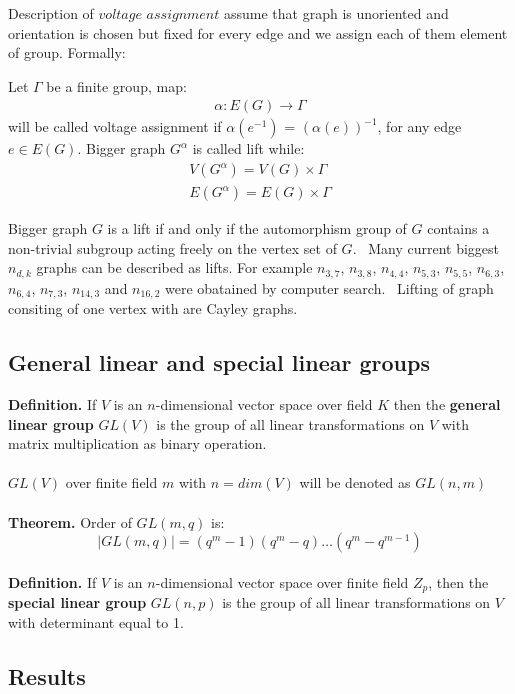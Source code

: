 \documentclass[a4paper,11pt,twoside]{report}%
\begin{document}
Description of $\textit{voltage assignment}$ assume that graph is unoriented and orientation is chosen but fixed for every edge and we assign each of them element of group. Formally: 

Let $\Gamma$ be a finite group, map:
\begin{align*}
	\alpha: E(G) \rightarrow \Gamma
\end{align*}	
will be called voltage assignment if $\alpha(e^{-1})$ = $(\alpha(e))^{-1}$, for any edge $e \in E(G)$. Bigger graph $G^{\alpha}$ is called lift while:  
\begin{align*}
	V(G^{\alpha}) = V(G) \times \Gamma \\
	E(G^{\alpha}) = E(G) \times \Gamma 
\end{align*}	


Bigger graph $G$ is a lift if and only if the automorphism group of $G$ contains a non-trivial subgroup acting freely on the vertex set of $G$.~\cite{Gross-Tucker} Many current biggest $n_{d,k}$ graphs can be described as lifts. For example $n_{3,7}$, $n_{3,8}$, $n_{4,4}$, $n_{5,3}$, $n_{5,5}$, $n_{6,3}$, $n_{6,4}$, $n_{7,3}$, $n_{14, 3}$ and $n_{16,2}$ were obatained by computer search.~\cite{Exoo} Lifting of graph consiting of one vertex with are Cayley graphs. 

\subsection{General linear and special linear groups}

\textbf{Definition.} If $V$ is an $n$-dimensional vector space over field $K$ then the \textbf{general linear group} $GL(V)$ is the group of all linear transformations on $V$ with matrix multiplication as binary operation.\\ \\
$GL(V)$ over finite field $m$ with $n=dim(V)$ will be denoted as $GL(n,m)$ \\ \\
\textbf{Theorem.} Order of $GL(m,q)$ is:
\begin{equation*}
	| GL(m,q) | = (q^{m} - 1)(q^{m} - q) \dots (q^{m} - q^{m-1}) 
\end{equation*}	\\
\textbf{Definition.} If $V$ is an $n$-dimensional vector space over finite field $Z_{p}$, then the \textbf{special linear group} $GL(n,p)$ is the group of all linear transformations on $V$ with determinant equal to 1.\\

\subsection{Results}

{}

\end{document}
